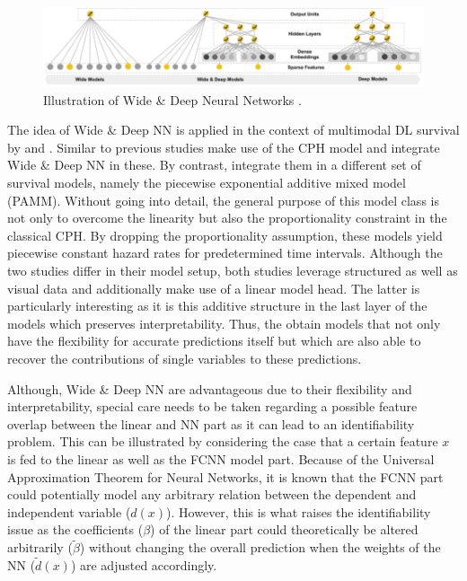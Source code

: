 \documentclass[
]{krantz}
\begin{document}
\begin{figure}

{\centering \includegraphics[width=1\linewidth]{figures/03-02-struc+unstruc-data/WideandDeepNN} 

}

\caption{Illustration of Wide \& Deep Neural Networks \citep{WideDeepNN2016}.}\label{fig:wide-deep-nn}
\end{figure}



The idea of Wide \& Deep NN is applied in the context of multimodal DL survival by \citet{Poelsterl2020} and \citet{DeepPAMM2022}. Similar to previous studies \citet{Poelsterl2020} make use of the CPH model and integrate Wide \& Deep NN in these. By contrast, \citet{DeepPAMM2022} integrate them in a different set of survival models, namely the piecewise exponential additive mixed model (PAMM). Without going into detail, the general purpose of this model class is not only to overcome the linearity but also the proportionality constraint in the classical CPH. By dropping the proportionality assumption, these models yield piecewise constant hazard rates for predetermined time intervals. Although the two studies differ in their model setup, both studies leverage structured as well as visual data and additionally make use of a linear model head. The latter is particularly interesting as it is this additive structure in the last layer of the models which preserves interpretability. Thus, the obtain models that not only have the flexibility for accurate predictions itself but which are also able to recover the contributions of single variables to these predictions.

Although, Wide \& Deep NN are advantageous due to their flexibility and interpretability, special care needs to be taken regarding a possible feature overlap between the linear and NN part as it can lead to an identifiability problem. This can be illustrated by considering the case that a certain feature \(x\) is fed to the linear as well as the FCNN model part. Because of the Universal Approximation Theorem for Neural Networks, it is known that the FCNN part could potentially model any arbitrary relation between the dependent and independent variable (\(d(x)\)). However, this is what raises the identifiability issue as the coefficients (\(\beta\)) of the linear part could theoretically be altered arbitrarily (\(\widetilde{\beta}\)) without changing the overall prediction when the weights of the NN (\(\widetilde{d}(x)\)) are adjusted accordingly.
\end{document}
